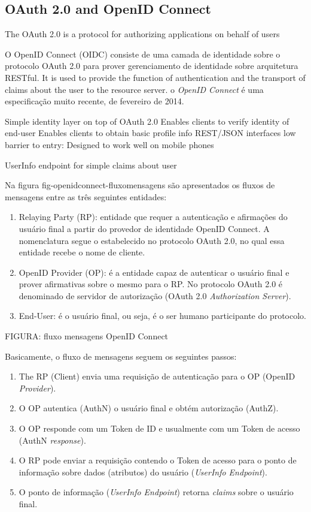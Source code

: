 \documentclass{doublecol-new}
\begin{document}
\subsection[sec:oauthoidc]{OAuth 2.0 and OpenID Connect}


The OAuth 2.0 is a protocol for authorizing applications on behalf of users

O OpenID Connect (OIDC) consiste de uma camada de identidade sobre o protocolo OAuth 2.0 para prover gerenciamento de identidade sobre arquitetura RESTful. It is used to provide the function of authentication and the transport of claims about the user to the resource server. o \textit{OpenID Connect} é uma especificação muito recente, de fevereiro de 2014.

Simple identity layer on top of OAuth 2.0
Enables clients to verify identity of end-user
Enables clients to obtain basic profile info
REST/JSON interfaces low barrier to entry: Designed to work well on
mobile phones

UserInfo endpoint for
simple claims about user

Na figura fig-openidconnect-fluxomensagens são apresentados os fluxos de mensagens entre as três seguintes entidades:

\begin{enumerate}
	\item Relaying Party (RP): entidade que requer a autenticação e afirmações do usuário final a partir do provedor de identidade OpenID Connect. A nomenclatura segue o estabelecido no protocolo OAuth 2.0, no qual essa entidade recebe o nome de cliente.
	\item OpenID Provider (OP): é a entidade capaz de autenticar o usuário final e prover afirmativas sobre o mesmo para o RP. No protocolo OAuth 2.0 é denominado de servidor de autorização (OAuth 2.0 \textit{Authorization Server}).
	\item End-User: é o usuário final, ou seja, é o ser humano participante do protocolo.
\end{enumerate}

FIGURA: fluxo mensagens OpenID Connect

Basicamente, o fluxo de mensagens seguem os seguintes passos:
\begin{enumerate}
	\item The RP (Client) envia uma requisição de autenticação para o OP (OpenID \textit{Provider}).
	\item O OP autentica (AuthN) o usuário final e obtém autorização (AuthZ).
	\item O OP responde com um Token de ID e usualmente com um Token de acesso (AuthN \textit{response}).
	\item O RP pode enviar a requisição contendo o Token de acesso para o ponto de informação sobre dados (atributos) do usuário (\textit{UserInfo Endpoint}).
	\item O ponto de informação (\textit{UserInfo Endpoint}) retorna \textit{claims} sobre o usuário final.
\end{enumerate}
\end{document}
